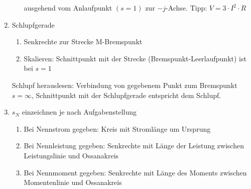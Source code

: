 \begin{enumerate}
\begin{enumerate}
        ausgehend vom Anlaufpunkt $(s=1)$ zur $-j$-Achse. Tipp: $V=3\cdot I^2\cdot R$
      \end{enumerate}
      \item Schlupfgerade
      \begin{enumerate}
        \item Senkrechte zur Strecke M-Bremspunkt
        \item Skalieren: Schnittpunkt mit der Strecke
        (Bremspunkt-Leerlaufpunkt) ist bei $s=1$
      \end{enumerate}
      Schlupf herauslesen: Verbindung von gegebenem Punkt zum Bremspunkt $s=\infty$, Schnittpunkt mit der Schlupfgerade entspricht dem Schlupf.
      \item $s_N$ einzeichnen je nach Aufgabenstellung
      \begin{enumerate}
        \item Bei Nennstrom gegeben: Kreis mit Stromlänge um Ursprung
        \item Bei Nennleistung gegeben: Senkrechte mit Länge der Leistung
        zwischen Leistungslinie und Ossanakreis
        \item Bei Nennmoment gegeben: Senkrechte mit Länge des Moments zwischen
        Momentenlinie und Ossanakreis
      \end{enumerate}
    \end{enumerate}   

		\begin{sideways}
		
    
		\end{sideways}
	
	
	        \newpage

